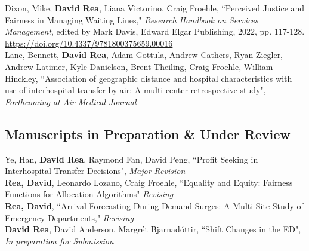 \documentclass[12pt, letter]{moderncv}
\begin{document}
Dixon, Mike, \textbf{David Rea}, Liana Victorino, Craig Froehle, ``Perceived Justice and Fairness in Managing Waiting Lines," \textit{Research Handbook on Services Management}, edited by Mark Davis, Edward Elgar Publishing, 2022, pp. 117-128.
\newline \url{https://doi.org/10.4337/9781800375659.00016}\\
\newpage
\medskip
Lane, Bennett, \textbf{David Rea}, Adam Gottula, Andrew Cathers, Ryan Ziegler,  Andrew Latimer,  Kyle Danielson, Brent Theiling, Craig Froehle, William Hinckley,  ``Association of geographic distance and hospital characteristics with use of interhospital transfer by air: A multi-center retrospective study", \textit{Forthcoming at Air Medical Journal}
\subsection{Manuscripts in Preparation \& Under Review}
Ye, Han, \textbf{David Rea}, Raymond Fan, David Peng, ``Profit Seeking in Interhospital Transfer Decisions", \textit{Major Revision}
\medskip\\
\smallskip
\textbf{Rea, David}, Leonardo Lozano, Craig Froehle,  ``Equality and Equity: Fairness Functions for Allocation Algorithms" \textit{Revising}
\medskip\\
\textbf{Rea, David}, ``Arrival Forecasting During Demand Surges: A Multi-Site Study of Emergency Departments," \textit{Revising}
\medskip\\
%
\textbf{David Rea}, David Anderson, Margr\'et Bjarnad\'ottir, ``Shift Changes in the ED", \textit{In preparation for Submission}
\end{document}
